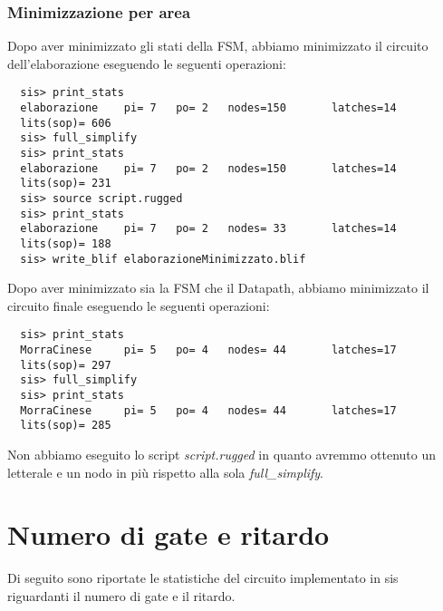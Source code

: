 \documentclass[a4paper]{article}
\begin{document}
\subsubsection{Minimizzazione per area}
Dopo aver minimizzato gli stati della FSM, abbiamo minimizzato il circuito dell'elaborazione eseguendo le
seguenti operazioni:
\begin{lstlisting}
  sis> print_stats
  elaborazione    pi= 7   po= 2   nodes=150       latches=14
  lits(sop)= 606
  sis> full_simplify
  sis> print_stats
  elaborazione    pi= 7   po= 2   nodes=150       latches=14
  lits(sop)= 231
  sis> source script.rugged
  sis> print_stats
  elaborazione    pi= 7   po= 2   nodes= 33       latches=14
  lits(sop)= 188
  sis> write_blif elaborazioneMinimizzato.blif
\end{lstlisting}

\noindent Dopo aver minimizzato sia la FSM che il Datapath, abbiamo minimizzato il circuito finale eseguendo le
seguenti operazioni:
\begin{lstlisting}
  sis> print_stats
  MorraCinese     pi= 5   po= 4   nodes= 44       latches=17
  lits(sop)= 297
  sis> full_simplify
  sis> print_stats
  MorraCinese     pi= 5   po= 4   nodes= 44       latches=17
  lits(sop)= 285
\end{lstlisting}
\noindent Non abbiamo eseguito lo script \emph{script.rugged} in quanto avremmo ottenuto un letterale e un nodo
in più rispetto alla sola \emph{full\_simplify}.

\section{Numero di gate e ritardo}
Di seguito sono riportate le statistiche del circuito implementato in sis riguardanti il numero di gate e il ritardo.
\end{document}
